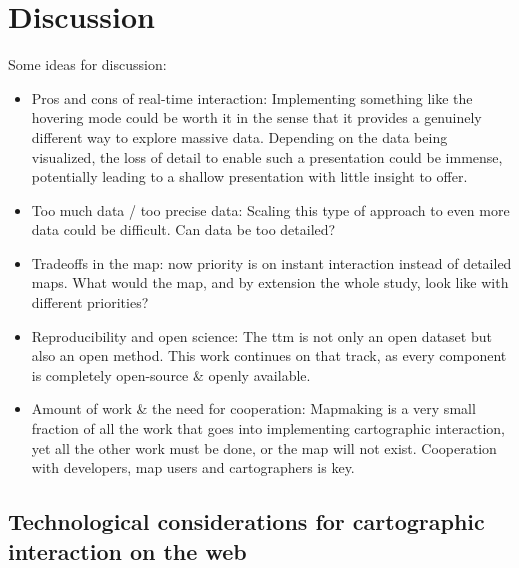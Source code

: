 \section{Discussion}

Some ideas for discussion:
\begin{itemize}
	\item Pros and cons of real-time interaction:
	Implementing something like the hovering mode could be worth it in the sense
	that it provides a genuinely different way to explore massive data.
	Depending on the data being visualized,
	the loss of detail to enable such a presentation could be immense,
	potentially leading to a shallow presentation with little insight to offer.
	\item Too much data / too precise data:
	Scaling this type of approach to even more data could be difficult. Can data be too detailed?
	\item Tradeoffs in the map:
	now priority is on instant interaction instead of detailed maps.
	What would the map, and by extension the whole study, look like with different priorities?
	\item Reproducibility and open science:
	The \acrshort{ttm} is not only an open dataset but also an open method.
	This work continues on that track,
	as every component is completely open-source \& openly available.
	\item Amount of work \& the need for cooperation:
	Mapmaking is a very small fraction of all the work that goes into implementing cartographic interaction,
	yet all the other work must be done, or the map will not exist.
	Cooperation with developers, map users and cartographers is key.
\end{itemize}

\subsection{Technological considerations for cartographic interaction on the web}

